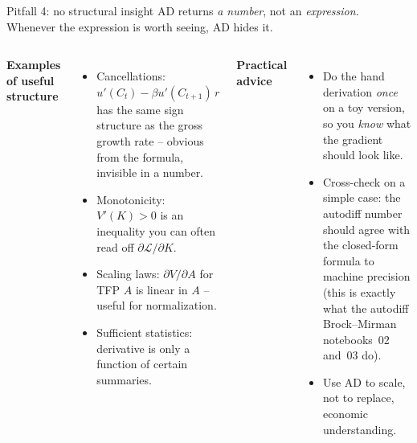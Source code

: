 \documentclass[aspectratio=169,11pt]{beamer}
\newcommand{\emphc}[1]{\textcolor{harvardcrimson}{#1}}
\begin{document}
\begin{frame}{Pitfall 4: no structural insight}
\small AD returns \emph{a number}, not an \emph{expression}. Whenever the expression is worth seeing, AD hides it.
\vspace{4pt}
\begin{columns}[t]
\textbf{Examples of useful structure}
\begin{itemize}\itemsep2pt
\item \emphc{Cancellations}: $u'(C_t) - \beta u'(C_{t+1})\,r$ has the same sign structure as the gross growth rate -- obvious from the formula, invisible in a number.
\item \emphc{Monotonicity}: $V'(K) > 0$ is an inequality you can often read off $\partial \mathcal{L}/\partial K$.
\item \emphc{Scaling laws}: $\partial V/\partial A$ for TFP $A$ is linear in $A$ -- useful for normalization.
\item \emphc{Sufficient statistics}: derivative is only a function of certain summaries.
\end{itemize}
\textbf{Practical advice}
\begin{itemize}\itemsep2pt
\item Do the hand derivation \emph{once} on a toy version, so you \emph{know} what the gradient should look like.
\item Cross-check on a simple case: the autodiff number should agree with the closed-form formula to machine precision (this is exactly what the autodiff Brock--Mirman notebooks~02 and~03 do).
\item Use AD to scale, not to replace, economic understanding.
\end{itemize}
\end{columns}
\end{frame}
\end{document}
